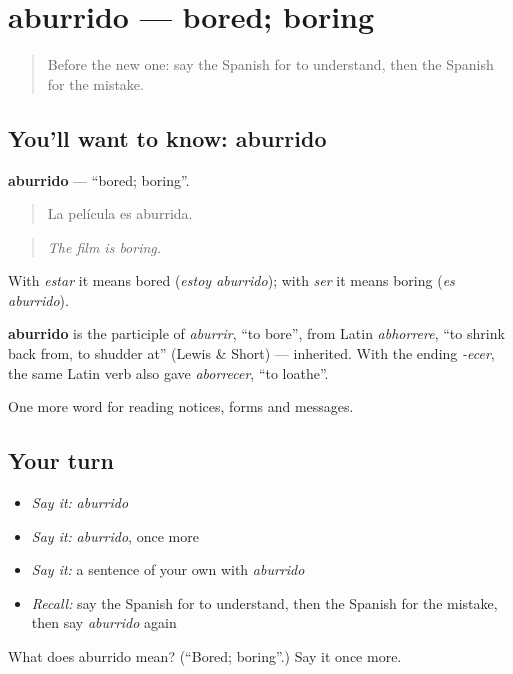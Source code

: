 \section[aburrido]{aburrido — bored; boring}

\label{lesson:ES-C476-aburrido}



\begin{quote}
Before the new one: say the Spanish for to understand, then the Spanish for the mistake.
\end{quote}

\subsection*{You'll want to know: aburrido}
\textbf{aburrido} — \textquotedblleft{}bored; boring\textquotedblright{}.

\begin{quote}
La película es aburrida.
\end{quote}

\begin{quote}
\emph{The film is boring.}
\end{quote}

With \emph{estar} it means bored (\emph{estoy aburrido}); with \emph{ser} it means boring (\emph{es aburrido}).

\begin{cousinweb}
\textbf{aburrido} is the participle of \emph{aburrir}, \textquotedblleft{}to bore\textquotedblright{}, from Latin \emph{abhorrere}, \textquotedblleft{}to shrink back from, to shudder at\textquotedblright{} (Lewis \& Short) — inherited. With the ending \emph{-ecer}, the same Latin verb also gave \emph{aborrecer}, \textquotedblleft{}to loathe\textquotedblright{}.
\end{cousinweb}

\begin{grammarlens}[title={What you've built}]
One more word for reading notices, forms and messages.
\end{grammarlens}

\subsection*{Your turn}
\begin{itemize}
\raggedright
  \item \emph{Say it:} \emph{aburrido}
  \item \emph{Say it:} \emph{aburrido}, once more
  \item \emph{Say it:} a sentence of your own with \emph{aburrido}
  \item \emph{Recall:} say the Spanish for to understand, then the Spanish for the mistake, then say \emph{aburrido} again
\end{itemize}

\begin{tcolorbox}[breakable,colback=teal!4,colframe=teal!35!black,title={Before you move on}]
What does aburrido mean? (\textquotedblleft{}Bored; boring\textquotedblright{}.) Say it once more.
\end{tcolorbox}
